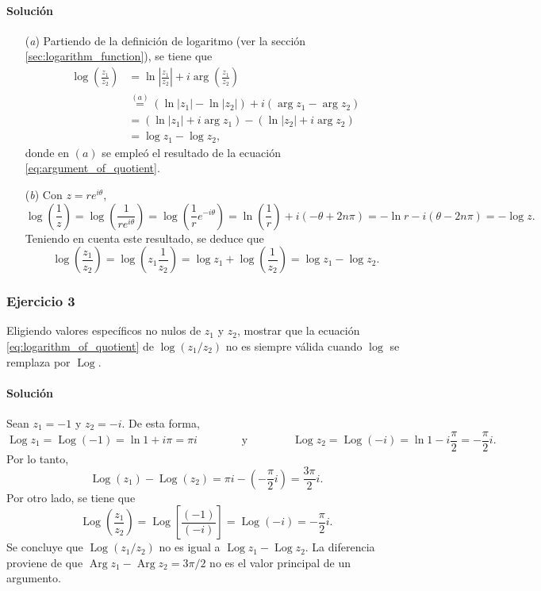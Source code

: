 \documentclass[a4paper]{report}
\DeclareMathOperator{\Arg}{Arg}
\DeclareMathOperator{\Log}{Log}
\begin{document}
\paragraph{Solución} 

\begin{enumerate}
 \item[(\textit{a})] Partiendo de la definición de logaritmo (ver la sección \ref{sec:logarithm_function}), se tiene que 
 \begin{align*}
  \log\left(\frac{z_1}{z_2}\right)&=\ln\left|\frac{z_1}{z_2}\right|+i\arg\left(\frac{z_1}{z_2}\right)\\
   &\overset{(a)}{=}(\ln|z_1|-\ln|z_2|)+i(\arg z_1-\arg z_2)\\
   &=(\ln|z_1|+i\arg z_1)-(\ln|z_2|+i\arg z_2)\\
   &=\log z_1-\log z_2,
 \end{align*}
 donde en \((a)\) se empleó el resultado de la ecuación \ref{eq:argument_of_quotient}.
 \item[(\textit{b})] Con \(z=re^{i\theta}\),
 \[
  \log\left(\frac{1}{z}\right)=\log\left(\frac{1}{re^{i\theta}}\right)
  =\log\left(\frac{1}{r}e^{-i\theta}\right)
  =\ln\left(\frac{1}{r}\right)+i(-\theta+2n\pi)
  =-\ln r-i(\theta-2n\pi)=-\log z.
 \]
 Teniendo en cuenta este resultado, se deduce que 
 \[
  \log\left(\frac{z_1}{z_2}\right)=\log\left(z_1\frac{1}{z_2}\right)
  =\log z_1+\log\left(\frac{1}{z_2}\right)
  =\log z_1-\log z_2.
 \]
\end{enumerate} 

\subsubsection{Ejercicio 3}

Eligiendo valores específicos no nulos de \(z_1\) y \(z_2\), mostrar que la ecuación \ref{eq:logarithm_of_quotient} de \(\log(z_1/z_2)\) no es siempre válida cuando \(\log\) se remplaza por \(\Log\).

\paragraph{Solución} Sean \(z_1=-1\) y \(z_2=-i\). De esta forma,
\[
 \Log z_1=\Log(-1)=\ln1+i\pi=\pi i
 \qquad\qquad\textrm{y}\qquad\qquad
 \Log z_2=\Log(-i)=\ln1-i\frac{\pi}{2}=-\frac{\pi}{2}i.
\]
Por lo tanto,
\[
 \Log(z_1)-\Log(z_2)=\pi i-\left(-\frac{\pi}{2}i\right)=\frac{3\pi}{2}i.
\]
Por otro lado, se tiene que 
\[
 \Log\left(\frac{z_1}{z_2}\right)=\Log\left[\frac{(-1)}{(-i)}\right]
 =\Log(-i)=-\frac{\pi}{2}i.
\]
Se concluye que \(\Log(z_1/z_2)\) no es igual a \(\Log z_1-\Log z_2\). La diferencia proviene de que \(\Arg z_1-\Arg z_2=3\pi/2\) no es el valor principal de un argumento.
\end{document}
